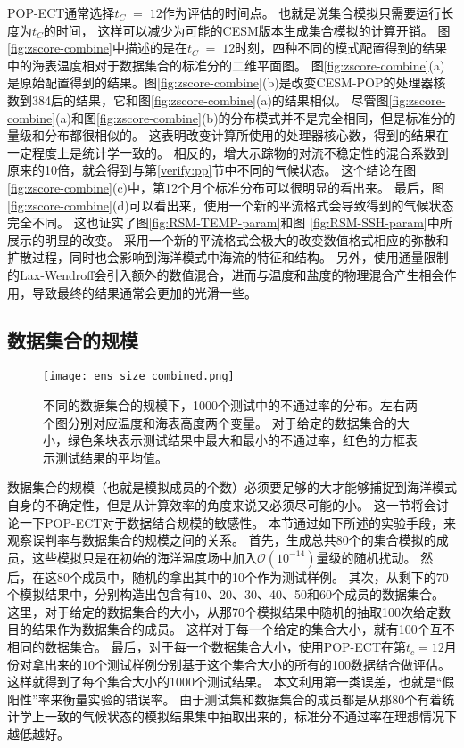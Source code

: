 POP-ECT通常选择$t_C \;=\; 12$作为评估的时间点。
也就是说集合模拟只需要运行长度为$t_C$的时间， 这样可以减少为可能的CESM版本生成集合模拟的计算开销。
图 \ref{fig:zscore-combine}中描述的是在$t_C \;=\; 12$时刻，四种不同的模式配置得到的结果中的海表温度相对于数据集合的标准分的二维平面图。
图\ref{fig:zscore-combine}(a)是原始配置得到的结果。图\ref{fig:zscore-combine}(b)是改变CESM-POP的处理器核数到384后的结果，它和图\ref{fig:zscore-combine}(a)的结果相似。
尽管图\ref{fig:zscore-combine}(a)和图\ref{fig:zscore-combine}(b)的分布模式并不是完全相同，但是标准分的量级和分布都很相似的。
这表明改变计算所使用的处理器核心数，得到的结果在一定程度上是统计学一致的。
相反的，增大示踪物的对流不稳定性的混合系数到原来的10倍，就会得到与第\ref{verify:pp}节中不同的气候状态。
这个结论在图\ref{fig:zscore-combine}(c)中，第12个月个标准分布可以很明显的看出来。 
最后，图\ref{fig:zscore-combine}(d)可以看出来，使用一个新的平流格式会导致得到的气候状态完全不同。
这也证实了图\ref{fig:RSM-TEMP-param}和图 \ref{fig:RSM-SSH-param}中所展示的明显的改变。 
采用一个新的平流格式会极大的改变数值格式相应的弥散和扩散过程\cite{tseng2008}，同时也会影响到海洋模式中海流的特征和结构\cite{tseng2006}。
另外，使用通量限制的Lax-Wendroff会引入额外的数值混合，进而与温度和盐度的物理混合产生相会作用，导致最终的结果通常会更加的光滑一些。



\subsection{数据集合的规模} \label{verify:ens}

\begin{figure} 
\centering
\texttt{[image: ens\_size\_combined.png]}
\caption{ 不同的数据集合的规模下，1000个测试中的不通过率的分布。左右两个图分别对应温度和海表高度两个变量。
对于给定的数据集合的大小，绿色条块表示测试结果中最大和最小的不通过率，红色的方框表示测试结果的平均值。}
\label{fig:temp_ens_80}
\end {figure}
数据集合的规模（也就是模拟成员的个数）必须要足够的大才能够捕捉到海洋模式自身的不确定性，但是从计算效率的角度来说又必须尽可能的小。
这一节将会讨论一下POP-ECT对于数据结合规模的敏感性。
本节通过如下所述的实验手段，来观察误判率与数据集合的规模之间的关系。 
首先，生成总共80个的集合模拟的成员，这些模拟只是在初始的海洋温度场中加入$\mathcal{O}(10^{-14})$量级的随机扰动。 
然后，在这80个成员中，随机的拿出其中的10个作为测试样例。 
其次，从剩下的70个模拟结果中，分别构造出包含有10、20、30、40、50和60个成员的数据集合。 
这里，对于给定的数据集合的大小，从那70个模拟结果中随机的抽取100次给定数目的结果作为数据集合的成员。
这样对于每一个给定的集合大小，就有100个互不相同的数据集合。 
最后，对于每一个数据集合大小，使用POP-ECT在第$t_c = 12$月份对拿出来的10个测试样例分别基于这个集合大小的所有的100数据结合做评估。
这样就得到了每个集合大小的1000个测试结果。
本文利用第一类误差，也就是“假阳性”率来衡量实验的错误率。 
由于测试集和数据集合的成员都是从那80个有着统计学上一致的气候状态的模拟结果集中抽取出来的，标准分不通过率在理想情况下越低越好。 

